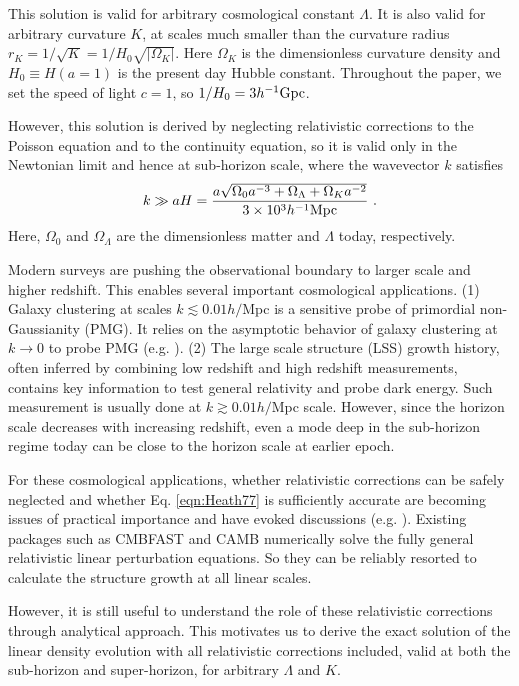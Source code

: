 \documentclass[aps,prl,showpacs,nobibnotes,twocolumn,
nobalancelastpage,superscriptaddress]{revtex4}
\newcommand{\be}{\begin{equation}}
\newcommand{\ee}{\end{equation}}
\newcommand{\ga}{\gtrsim}
\newcommand{\la}{\lesssim}
\newcommand{\mpch}{h^{-1} {\rm Mpc}}
\newcommand{\gpch}{h^{-1} {\rm Gpc}}
\begin{document}
This solution is
valid for arbitrary cosmological constant 
$\Lambda$. It is also valid for arbitrary curvature $K$, at scales much
smaller than the curvature radius
$r_K=1/\sqrt{K}=1/H_0\sqrt{|\Omega_K|}$. Here 
$\Omega_K$ is the dimensionless curvature density and $H_0\equiv H(a=1)$ is
the present day Hubble constant.  Throughout the paper, we
set the speed of light $c=1$, so $1/H_0=3\gpch$. 

However, this solution is derived by neglecting relativistic corrections
to the Poisson equation and to the continuity equation, so it is valid only in the
Newtonian limit and hence at sub-horizon scale, where the wavevector $k$
satisfies
\be
\label{eqn:horizon}
k\gg aH=\frac{a\sqrt{\Omega_0a^{-3}+\Omega_{\Lambda}+\Omega_Ka^{-2}}}{3\times 10^3 \mpch}
\ .
\ee
Here, $\Omega_0$ and $\Omega_\Lambda$  are the dimensionless matter and 
$\Lambda$ today, respectively.  

Modern surveys are pushing the observational boundary to  larger scale and
higher redshift. This enables several important cosmological
applications. (1) Galaxy clustering at scales $k\la 0.01 h/$Mpc is a sensitive 
probe of primordial non-Gaussianity (PMG). It relies on the asymptotic
behavior of galaxy clustering at $k\rightarrow 0$ to probe PMG
(e.g. \cite{Dalal08}). (2) The large scale structure (LSS) growth history, often
inferred  by  combining low redshift and high redshift measurements, contains key
information to test general relativity and probe dark energy. Such measurement
is usually done at $k\ga 0.01 h/$Mpc  scale. However, since the horizon scale 
decreases with increasing redshift, even a mode deep in the  sub-horizon
regime today can be close to the horizon scale at earlier epoch. 

For these cosmological applications, whether
relativistic corrections can be safely neglected and whether
Eq. \ref{eqn:Heath77} is sufficiently accurate are  becoming issues of practical
importance and have evoked discussions (e.g. \cite{Dent09}).  Existing 
packages such as CMBFAST \cite{CMBFAST} and CAMB \cite{CAMB} numerically solve 
the fully general relativistic  linear perturbation equations. So they can be
reliably resorted to calculate the structure growth  at all linear scales.

 However,  it is still useful to understand the role of
these relativistic corrections  through  analytical
approach.  This motivates us to derive
the exact solution of the linear density evolution with all relativistic
corrections included,  valid at both the
sub-horizon and super-horizon, for 
 arbitrary $\Lambda$ and $K$. 
\end{document}
